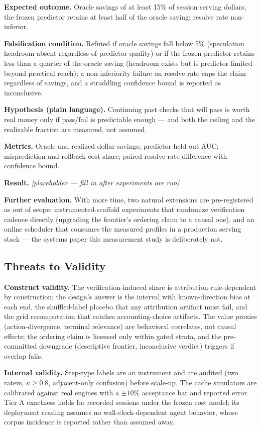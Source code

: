 \documentclass[11pt]{article}
\newcommand{\ph}{\textit{[placeholder --- fill in after experiments are run]}}
\begin{document}
\textbf{Expected outcome.} Oracle savings of at least 15\% of session serving dollars; the frozen predictor retains at least half of the oracle saving; resolve rate non-inferior.

\textbf{Falsification condition.} Refuted if oracle savings fall below 5\% (speculation headroom absent regardless of predictor quality) or if the frozen predictor retains less than a quarter of the oracle saving (headroom exists but is predictor-limited beyond practical reach); a non-inferiority failure on resolve rate caps the claim regardless of savings, and a straddling confidence bound is reported as inconclusive.

\textbf{Hypothesis (plain language).} Continuing past checks that will pass is worth real money only if pass/fail is predictable enough --- and both the ceiling and the realizable fraction are measured, not assumed.

\textbf{Metrics.} Oracle and realized dollar savings; predictor held-out AUC; misprediction and rollback cost share; paired resolve-rate difference with confidence bound.

\textbf{Result.} \ph

\textbf{Further evaluation.} With more time, two natural extensions are pre-registered as out of scope: instrumented-scaffold experiments that randomize verification cadence directly (upgrading the frontier's ordering claim to a causal one), and an online scheduler that consumes the measured profiles in a production serving stack --- the systems paper this measurement study is deliberately not.

\subsection{Threats to Validity}

\textbf{Construct validity.} The verification-induced share is attribution-rule-dependent by construction; the design's answer is the interval with known-direction bias at each end, the shuffled-label placebo that any attribution artifact must fail, and the grid recomputation that catches accounting-choice artifacts. The value proxies (action-divergence, terminal relevance) are behavioral correlates, not causal effects; the ordering claim is licensed only within gated strata, and the pre-committed downgrade (descriptive frontier, inconclusive verdict) triggers if overlap fails.

\textbf{Internal validity.} Step-type labels are an instrument and are audited (two raters, $\kappa \geq 0.8$, adjacent-only confusion) before scale-up. The cache simulators are calibrated against real engines with a $\pm 10\%$ acceptance bar and reported error. Tier-A exactness holds for recorded sessions under the frozen cost model; its deployment reading assumes no wall-clock-dependent agent behavior, whose corpus incidence is reported rather than assumed away.
\end{document}
